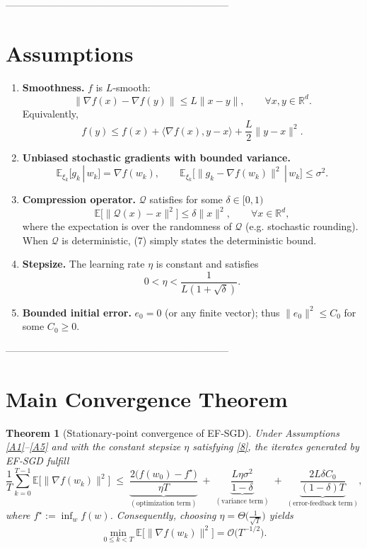 \documentclass{article}
\newtheorem{theorem}{Theorem}
\begin{document}
--------------------------------------------------------------------

\section*{Assumptions}
\begin{enumerate}[label=\textbf{A\arabic*},leftmargin=*,align=left]
\item \label{A1} \textbf{Smoothness.} $f$ is $L$‑smooth:
\[
\|\nabla f(x)-\nabla f(y)\|\le L\|x-y\|,\qquad\forall x,y\in\mathbb{R}^d.
\]
Equivalently,
\[
f(y)\le f(x)+\langle\nabla f(x),y-x\rangle+\frac{L}{2}\|y-x\|^2 .
\tag{5}
\]

\item \label{A2} \textbf{Unbiased stochastic gradients with bounded variance.}
\[
\mathbb{E}_{\xi_k}[g_k\,|\,w_k]=\nabla f(w_k),\qquad
\mathbb{E}_{\xi_k}\big[\|g_k-\nabla f(w_k)\|^2\,|\,w_k\big]\le\sigma^2 .
\tag{6}
\]

\item \label{A3} \textbf{Compression operator.} $\mathcal{Q}$ satisfies for some $\delta\in[0,1)$
\[
\mathbb{E}\!\big[\|\mathcal{Q}(x)-x\|^2\big]\le \delta\|x\|^2,\qquad\forall x\in\mathbb{R}^d,
\tag{7}
\]
where the expectation is over the randomness of $\mathcal{Q}$ (e.g. stochastic rounding).  
When $\mathcal{Q}$ is deterministic, (7) simply states the deterministic bound.

\item \label{A4} \textbf{Stepsize.} The learning rate $\eta$ is constant and satisfies
\[
0<\eta<\frac{1}{L(1+\sqrt{\delta})}.
\tag{8}
\]

\item \label{A5} \textbf{Bounded initial error.} $e_0=0$ (or any finite vector); thus $\|e_0\|^2\le C_0$ for some $C_0\ge0$.
\end{enumerate}

--------------------------------------------------------------------

\section*{Main Convergence Theorem}
\begin{theorem}[Stationary‑point convergence of EF‑SGD]\label{thm:main}
Under Assumptions \ref{A1}–\ref{A5} and with the constant stepsize $\eta$ satisfying \eqref{8}, the iterates generated by EF‑SGD fulfill
\[
\frac{1}{T}\sum_{k=0}^{T-1}\mathbb{E}\!\big[\|\nabla f(w_k)\|^2\big]
\;\le\;
\underbrace{\frac{2\big(f(w_0)-f^\star\big)}{\eta T}}_{(\text{optimization term})}
\;+\;
\underbrace{\frac{L\eta\sigma^2}{1-\delta}}_{(\text{variance term})}
\;+\;
\underbrace{\frac{2L\delta C_0}{(1-\delta)T}}_{(\text{error‑feedback term})},
\tag{9}
\]
where $f^\star:=\inf_{w}f(w)$.
Consequently, choosing $\eta = \Theta\!\big(\tfrac{1}{\sqrt{T}}\big)$ yields
\[
\min_{0\le k<T}\mathbb{E}\!\big[\|\nabla f(w_k)\|^2\big]=\mathcal{O}\!\big(T^{-1/2}\big).
\]
\end{theorem}
\end{document}
